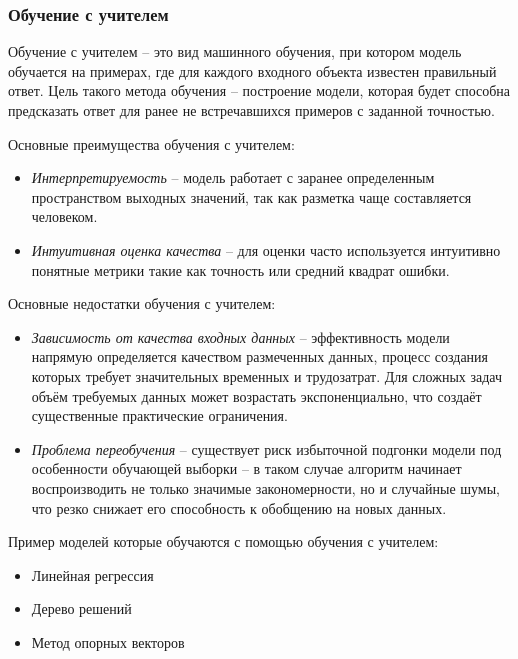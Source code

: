 \documentclass[../part_1.tex]{subfiles}
\begin{document}
\subsubsection{Обучение с учителем} %
    \label{sec:with_teacher}
    \par Обучение с учителем -- это вид машинного обучения, при котором модель обучается на примерах, где для каждого входного объекта известен правильный ответ. Цель такого метода обучения -- построение модели, которая будет способна предсказать ответ для ранее не встречавшихся примеров с заданной точностью.
    \par Основные преимущества обучения с учителем:
    \begin{itemize}
        \item \textit{Интерпретируемость} -- модель работает с заранее определенным пространством выходных значений, так как разметка чаще составляется человеком.
        \item \textit{Интуитивная оценка качества} -- для оценки часто используется интуитивно понятные метрики такие как точность или средний квадрат ошибки. 
    \end{itemize}
    \par Основные недостатки обучения с учителем:
    \begin{itemize}
        \item \textit{Зависимость от качества входных данных} -- эффективность модели напрямую определяется качеством размеченных данных, процесс создания которых требует значительных временных и трудозатрат. Для сложных задач объём требуемых данных может возрастать экспоненциально, что создаёт существенные практические ограничения.
        \item \textit{Проблема переобучения} -- существует риск избыточной подгонки модели под особенности обучающей выборки -- в таком случае алгоритм начинает воспроизводить не только значимые закономерности, но и случайные шумы, что резко снижает его способность к обобщению на новых данных.
    \end{itemize}
    \par Пример моделей которые обучаются с помощью обучения с учителем:
    \begin{itemize}
        \item Линейная регрессия
        \item Дерево решений
        \item Метод опорных векторов
    \end{itemize}
    
\end{document}
